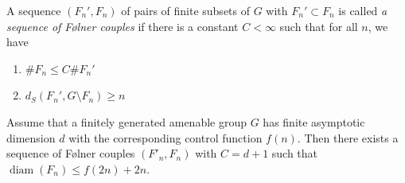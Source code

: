 \documentclass[10pt,a4paper]{amsart}
\newcommand{\diam}{\operatorname{diam}}
\begin{document}
\begin{definition} \label{defn:couples}
    
A sequence $(F_n',F_n)$ of pairs of finite subsets
of $G$ with $F_n'\subset F_n$ is called {\it a sequence of F{\o}lner couples}
if there is a constant $C < \infty$ such that for all $n$, we have
 \begin{enumerate}
    \item $\#F_n \leqslant C\#F_n'$
    \item $d_S(F_n',G\setminus F_n) \geqslant n$
\end{enumerate}
\end{definition}

\begin{thm}\label{pr:dimtoisodiam}
Assume that a finitely generated amenable group $G$ has finite asymptotic dimension $d$ with the corresponding control function
 $f(n)$.
Then there exists a sequence of F{\o}lner couples $(F'_n,F_n)$ with $C = d+1$ such that
$\diam(F_n) \leqslant f(2n)+2n$.
\end{thm}
\end{document}
